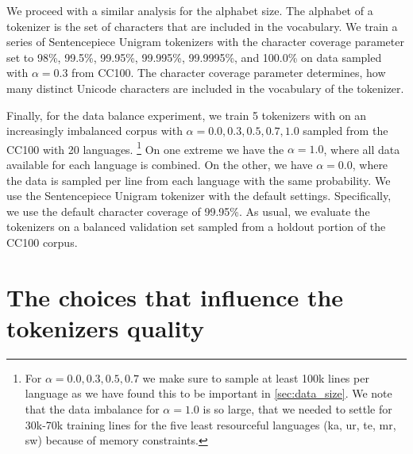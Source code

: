 We proceed with a similar analysis for the alphabet size. The alphabet of a tokenizer is the set of characters that are included in the vocabulary. We train a series of Sentencepiece Unigram tokenizers with the character coverage parameter set to 98\%, 99.5\%, 99.95\%, 99.995\%, 99.9995\%, and 100.0\% on data sampled with $\alpha=0.3$ from CC100. The character coverage parameter determines, how many distinct Unicode characters are included in the vocabulary of the tokenizer.

Finally, for the data balance experiment, we train 5 tokenizers with on an increasingly imbalanced corpus with $\alpha = 0.0, 0.3, 0.5, 0.7, 1.0$ sampled from the CC100 with 20 languages. \footnote{For $\alpha = 0.0, 0.3, 0.5, 0.7$ we make sure to sample at least 100k lines per language as we have found this to be important in \autoref{sec:data_size}. We note that the data imbalance for $\alpha=1.0$ is so large, that we needed to settle for 30k-70k training lines for the five least resourceful languages (ka, ur, te, mr, sw) because of memory constraints.} On one extreme we have the $\alpha=1.0$, where all data available for each language is combined. On the other, we have $\alpha=0.0$, where the data is sampled per line from each language with the same probability. We use the Sentencepiece Unigram tokenizer with the default settings. Specifically, we use the default character coverage of 99.95\%. As usual, we evaluate the tokenizers on a balanced validation set sampled from a holdout portion of the CC100 corpus. 


\section{The choices that influence the tokenizers quality}

